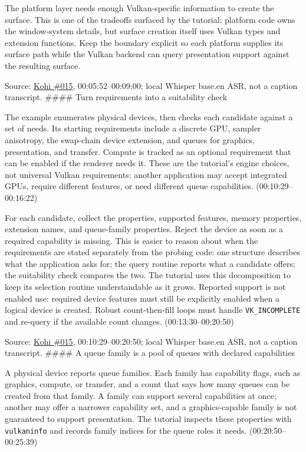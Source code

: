 The platform layer needs enough Vulkan-specific information to create the surface. This is one of the tradeoffs surfaced by the tutorial: platform code owns the window-system details, but surface creation itself uses Vulkan types and extension functions. Keep the boundary explicit so each platform supplies its surface path while the Vulkan backend can query presentation support against the resulting surface.

Source: \href{https://www.youtube.com/watch?v=6Kj3O2Ov1RU}{Kohi \#015}, 00:05:52--00:09:00; local Whisper base.en ASR, not a caption transcript. \#\#\#\# Turn requirements into a suitability check

The example enumerates physical devices, then checks each candidate against a set of needs. Its starting requirements include a discrete GPU, sampler anisotropy, the swap-chain device extension, and queues for graphics, presentation, and transfer. Compute is tracked as an optional requirement that can be enabled if the renderer needs it. These are the tutorial's engine choices, not universal Vulkan requirements: another application may accept integrated GPUs, require different features, or need different queue capabilities. (00:10:29--00:16:22)

For each candidate, collect the properties, supported features, memory properties, extension names, and queue-family properties. Reject the device as soon as a required capability is missing. This is easier to reason about when the requirements are stated separately from the probing code: one structure describes what the application asks for; the query routine reports what a candidate offers; the suitability check compares the two. The tutorial uses this decomposition to keep its selection routine understandable as it grows. Reported support is not enabled use: required device features must still be explicitly enabled when a logical device is created. Robust count-then-fill loops must handle \texttt{VK\_INCOMPLETE} and re-query if the available count changes. (00:13:30--00:20:50)

Source: \href{https://www.youtube.com/watch?v=6Kj3O2Ov1RU}{Kohi \#015}, 00:10:29--00:20:50; local Whisper base.en ASR, not a caption transcript. \#\#\#\# A queue family is a pool of queues with declared capabilities

A physical device reports queue families. Each family has capability flags, such as graphics, compute, or transfer, and a count that says how many queues can be created from that family. A family can support several capabilities at once; another may offer a narrower capability set, and a graphics-capable family is not guaranteed to support presentation. The tutorial inspects these properties with \texttt{vulkaninfo} and records family indices for the queue roles it needs. (00:20:50--00:25:39)

